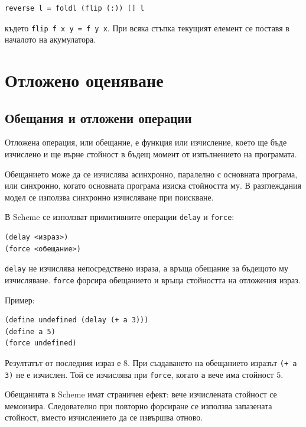\begin{verbatim}
reverse l = foldl (flip (:)) [] l
\end{verbatim}

където \texttt{flip f x y = f y x}. При всяка стъпка текущият елемент се поставя в началото на акумулатора.

\section{Отложено оценяване}\label{s:20.5}

\subsection{Обещания и отложени операции}\label{s:20.5.1}

\begin{defn}
Отложена операция, или обещание, е функция или изчисление, което ще бъде изчислено и ще върне стойност в бъдещ момент от изпълнението на програмата.
\end{defn}

Обещанието може да се изчислява асинхронно, паралелно с основната програма, или синхронно, когато основната програма изиска стойността му. В разглеждания модел се използва синхронно изчисляване при поискване.

В Scheme се използват примитивните операции \texttt{delay} и \texttt{force}:

\begin{verbatim}
(delay <израз>)
(force <обещание>)
\end{verbatim}

\texttt{delay} не изчислява непосредствено израза, а връща обещание за бъдещото му изчисляване. \texttt{force} форсира обещанието и връща стойността на отложения израз.

Пример:

\begin{verbatim}
(define undefined (delay (+ a 3)))
(define a 5)
(force undefined)
\end{verbatim}

Резултатът от последния израз е $8$. При създаването на обещанието изразът \texttt{(+ a 3)} не е изчислен. Той се изчислява при \texttt{force}, когато \texttt{a} вече има стойност $5$.

Обещанията в Scheme имат страничен ефект: вече изчислената стойност се мемоизира. Следователно при повторно форсиране се използва запазената стойност, вместо изчислението да се извършва отново.

